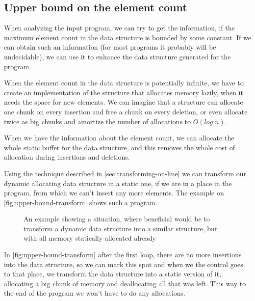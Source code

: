 \documentclass[a4paper,11pt]{article}
\begin{document}
            
	\subsection{Upper bound on the element count}

		When analyzing the input program, we can try to get the information, if the maximum element count in the
		data structure is bounded by some constant. If we can obtain such an information (for most programs it
		probably will be undecidable), we can use it to enhance the data structure generated for the program.

		When the element count in the data structure is potentially infinite, we have to create an
		implementation of the structure that allocates memory lazily, when it needs the space for new elements.
		We can imagine that a structure can allocate one chunk on every insertion and free a chunk on every
		deletion, or even allocate twice as big chunks and amortize the number of allocations to $O(log \; n)$.

		When we have the information about the element count, we can allocate the whole static buffer for the
		data structure, and this removes the whole cost of allocation during insertions and deletions.

		Using the technique described in \autoref{sec:transforming-on-line} we can transform our dynamic
		allocating data structure in a static one, if we are in a place in the program, from which we can't
		insert any more elements. The example on \autoref{fig:upper-bound-transform} shows such a program.

		\begin{figure}
			

			\caption{An example showing a situation, where beneficial would be to transform a dynamic data
			structure into a similar structure, but with all memory statically allocated already}

			\label{fig:upper-bound-transform}
		\end{figure}

		In \autoref{fig:upper-bound-transform} after the first loop, there are no more insertions into the data
		structure, so we can mark this spot and when we the control goes to that place, we transform the data
		structure into a static version of it, allocating a big chunk of memory and deallocating all that was
		left. This way to the end of the program we won't have to do any allocations.
\end{document}

